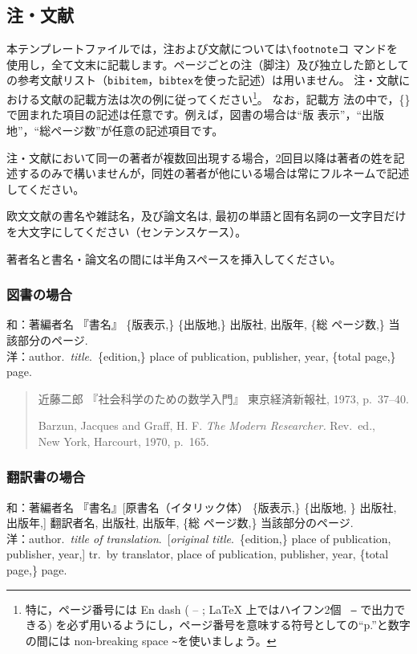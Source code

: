 \documentclass[b5paper,10pt,twocolumn,tombow]{jarticle}
\begin{document}
\subsection{注・文献} \label{123950_27Oct08}
本テンプレートファイルでは，注および文献については\verb|\footnote|コ
マンドを
使用し，全て文末に記載します。ページごとの注（脚注）及び独立した節としての参考文献リスト（\texttt{bibitem}，\texttt{bibtex}を使った記述）は用いません。
注・文献における文献の記載方法は次の例に従ってください\footnote{特に，ページ番号には En dash ( -- ; \LaTeX{} 上ではハイフン2個 \texttt{ --} で出力できる) を必ず用いるようにし，ページ番号を意味する符号としての``p.''と数字の間には non-breaking space \texttt{\~}を使いましょう。}。
なお，記載方
法の中で，\{\}で囲まれた項目の記述は任意です。例えば，図書の場合は``版
表示''，``出版地''，``総ページ数''が任意の記述項目です。

注・文献において同一の著者が複数回出現する場合，2回目以降は著者の姓を記述するのみで構いませんが，同姓の著者が他にいる場合は常にフルネームで記述してください。

欧文文献の書名や雑誌名，及び論文名は, 最初の単語と固有名詞の一文字目だけを大文字にしてください（センテンスケース）。

著者名と書名・論文名の間には半角スペースを挿入してください。

\subsubsection{図書の場合}
\noindent{}和：著編者名 『書名』 \{版表示,\} \{出版地,\} 出版社, 出版年, \{総
\bigskip
ページ数,\} 当該部分のページ.\\
洋：author.\ \textit{title}.\ \{edition,\} place of publication,
publisher, year, \{total page,\} page.
\begin{quote}
  近藤二郎 『社会科学のための数学入門』 東京経済新報社, 1973,
  p.~37--40.

  Barzun, Jacques and Graff, H. F. \textit{The Modern Researcher.}
  Rev.\ ed., \\New York, Harcourt, 1970, p.~165.
\end{quote}


\subsubsection{翻訳書の場合}
\noindent{}和：著編者名 『書名』[原書名（イタリック体） \{版表示,\}
\{出版地, \} 出版社, 出版年,] 翻訳者名, 出版社, 出版年, \{総
\bigskip
ページ数,\} 当該部分のページ.\\
洋：author.\ \textit{title of translation}.\ [\textit{original
title}.\ \{edition,\} place of publication, publisher, year,] tr.\ by
translator, place of publication, publisher, year, \{total page,\} page.
\end{document}
